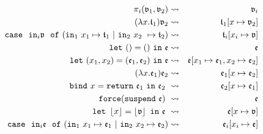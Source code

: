 \begin{eqnarray*}
\pi_i(\v_1, \v_2) &\leadsto& \v_i\\
(\lambda x.\t_1)\v_2 &\leadsto& \t_1 [x \mapsto \v_2]\\
\mathtt{case}\ \ \mathtt{in}_i\v \ \ \mathtt{of}\ (\mathtt{in}_1\ x_1 \mapsto \t_1\  \lvert\  \mathtt{in}_2 \ x_2 \ \mapsto \t_2) &\leadsto& \t_i [x_i \mapsto \v]\\
\mathtt{let}\ ()=()\ \mathtt{in} \ \e &\leadsto& \e\\
\mathtt{let}\ (x_1,x_2)=(\e_1,\e_2)\ \mathtt{in}\ \e &\leadsto& \e[x_1 \mapsto \e_1, x_2 \mapsto \e_2]\\
(\lambda x.\e_1)\e_2 &\leadsto& \e_1[x \mapsto \e_2]\\
\mathtt{bind}\ x = \mathtt{return} \ \e_1\ \mathtt{in} \ \e_2\ &\leadsto&\ \e_2 [x \mapsto \e_1]\\
\mathtt{force}( \mathtt{suspend}\ \e)\ &\leadsto& \e\\
\mathtt{let}\  \floor{x}=\floor{\v}\  \mathtt{in}\ \e\ &\leadsto& \e[x\mapsto \v]\\
\mathtt{case}\ \ \mathtt{in}_i\e \ \ \mathtt{of}\ (\mathtt{in}_1\ x_1 \mapsto \e_1\  \lvert\  \mathtt{in}_2 \ x_2 \mapsto \e_2) &\leadsto& \e_i [x_i \mapsto \e]
\end{eqnarray*}